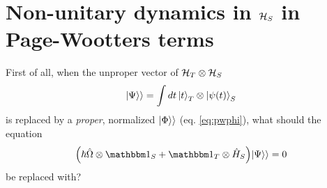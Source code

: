 \section{Non-unitary dynamics in $\mathcal{H}_S$ in Page-Wootters terms}

First of all,
when the unproper vector of $\mathcal{H}_T \otimes \mathcal{H}_S$
\begin{equation}
  |\Psi\rangle\rangle = \int dt \ket{t}_{T} \otimes \ket{\psi(t)}_{S}
\end{equation}
is replaced by a \emph{proper}, normalized $|\Phi\rangle\rangle$ (eq. \ref{eq:pwphi}),
what should the equation
\begin{equation}
  \qty(\hbar\hat{\Omega} \ox \idop_S + \idop_T \ox \hat{H}_S)\dket{\Psi} = 0
\end{equation}
be replaced with?